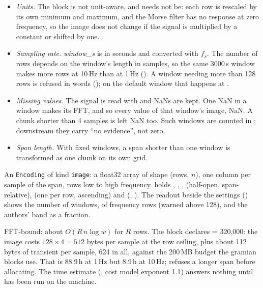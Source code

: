 \begin{itemize}
\item \emph{Units.} The block is not unit-aware, and needs not be: each row is rescaled by its
  own minimum and maximum, and the Morse filter has no response at zero frequency, so the
  image does not change if the signal is multiplied by a constant or shifted by one.
\item \emph{Sampling rate.} \emph{window\_s} is in seconds and converted with $f_s$. The
  number of rows depends on the window's length in samples, so the same 3000\,s window
  makes more rows at 10\,Hz than at 1\,Hz (). A window needing more
  than 128 rows is refused in words (); on the default window that happens at
  .
\item \emph{Missing values.} The signal is read with  and
  NaNs are kept. One NaN in a window makes its FFT, and so every value of that window's image,
  NaN. A chunk shorter than 4 samples is left NaN too. Such windows are counted in
  ; downstream they carry ``no evidence'', not zero.
\item \emph{Span length.} With fixed windows, a span shorter than one window is transformed
  as one chunk on its own grid.
\end{itemize}

An \texttt{Encoding} of kind \texttt{image}: a float32 array of shape (rows, $n$), one column
per sample of the span, rows low to high frequency.  holds ,
, ,  (half-open, span-relative),
 (one per row, ascending) and  (, ).
The readout beside the settings () shows the number of windows, of frequency
rows (warned above 128), and the authors' band as a  fraction.

FFT-bound: about $O(R\,n\log w)$ for $R$ rows. The block declares  =
320{,}000: the image costs $128 \times 4 = 512$ bytes per sample at the row ceiling, plus about
112 bytes of transient per sample, 624 in all, against the 200\,MB budget the gramian blocks
use. That is 88.9\,h at 1\,Hz but 8.9\,h at 10\,Hz; 
refuses a longer span before allocating. The time estimate (, cost model
exponent 1.1) answers nothing until  has been run on the
machine.

